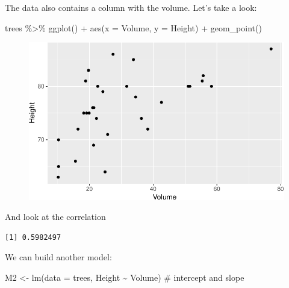 \documentclass[
  letterpaper,
  DIV=11,
  numbers=noendperiod]{scrreprt}
\newenvironment{Shaded}{\begin{snugshade}}{\end{snugshade}}
\newcommand{\AttributeTok}[1]{\textcolor[rgb]{0.40,0.45,0.13}{#1}}
\newcommand{\CommentTok}[1]{\textcolor[rgb]{0.37,0.37,0.37}{#1}}
\newcommand{\FunctionTok}[1]{\textcolor[rgb]{0.28,0.35,0.67}{#1}}
\newcommand{\NormalTok}[1]{\textcolor[rgb]{0.00,0.23,0.31}{#1}}
\newcommand{\OtherTok}[1]{\textcolor[rgb]{0.00,0.23,0.31}{#1}}
\newcommand{\SpecialCharTok}[1]{\textcolor[rgb]{0.37,0.37,0.37}{#1}}
\begin{document}
The data also contains a column with the volume. Let's take a look:

\begin{Shaded}
\begin{Highlighting}[]
\NormalTok{trees }\SpecialCharTok{\%\textgreater{}\%} \FunctionTok{ggplot}\NormalTok{() }\SpecialCharTok{+} \FunctionTok{aes}\NormalTok{(}\AttributeTok{x =}\NormalTok{ Volume, }\AttributeTok{y =}\NormalTok{ Height) }\SpecialCharTok{+} \FunctionTok{geom\_point}\NormalTok{()}
\end{Highlighting}
\end{Shaded}

\begin{figure}[H]

{\centering \includegraphics{./10-model_selection_files/figure-pdf/unnamed-chunk-10-1.pdf}

}

\end{figure}

And look at the correlation

\begin{Shaded}
\end{Shaded}

\begin{verbatim}
[1] 0.5982497
\end{verbatim}

We can build another model:

\begin{Shaded}
\begin{Highlighting}[]
\NormalTok{M2 }\OtherTok{\textless{}{-}} \FunctionTok{lm}\NormalTok{(}\AttributeTok{data =}\NormalTok{ trees, Height }\SpecialCharTok{\textasciitilde{}}\NormalTok{ Volume) }\CommentTok{\# intercept and slope}
\end{Highlighting}
\end{Shaded}
\end{document}
